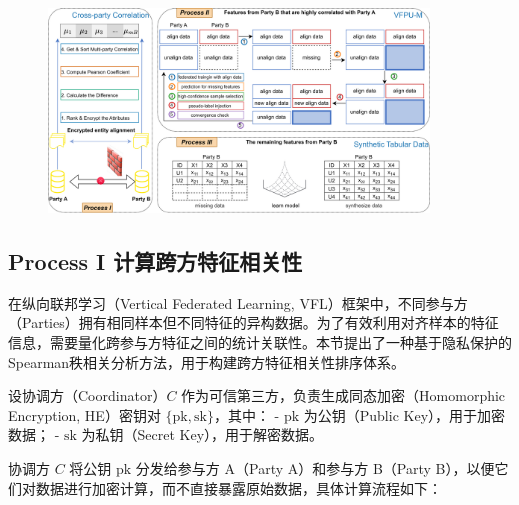 \vspace{-0.1cm}
\begin{figure}[H]  %
	\centering     %
	\includegraphics[width=0.9\textwidth]{chapters/imgs/VFPU-M-Syn}  
	
	
	\label{fig:VFPU-M-Syn}  %
\end{figure}
\vspace{-0.35cm}

\subsection{Process I 计算跨方特征相关性}
在纵向联邦学习（Vertical Federated Learning, VFL）框架中，不同参与方（Parties）拥有相同样本但不同特征的异构数据。为了有效利用对齐样本的特征信息，需要量化跨参与方特征之间的统计关联性。本节提出了一种基于隐私保护的Spearman秩相关分析方法，用于构建跨方特征相关性排序体系。

设协调方（Coordinator）$ C $ 作为可信第三方，负责生成同态加密（Homomorphic Encryption, HE）密钥对 $ \{\text{pk}, \text{sk}\} $，其中：
- $ \text{pk} $ 为公钥（Public Key），用于加密数据；
- $ \text{sk} $ 为私钥（Secret Key），用于解密数据。

协调方 $ C $ 将公钥 $ \text{pk} $ 分发给参与方 A（Party A）和参与方 B（Party B），以便它们对数据进行加密计算，而不直接暴露原始数据，具体计算流程如下：


